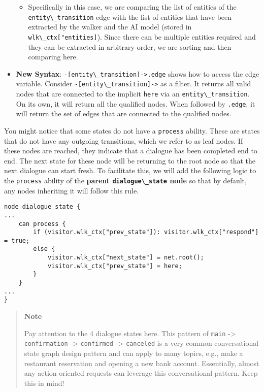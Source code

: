 \begin{itemize}
  \begin{itemize}
  \tightlist
  \item
    Specifically in this case, we are comparing the list of entities of
    the \passthrough{\lstinline!entity\_transition!} edge with the list
    of entities that have been extracted by the walker and the AI model
    (stored in \passthrough{\lstinline!wlk\_ctx["entities]!}). Since
    there can be multiple entities required and they can be extracted in
    arbitrary order, we are sorting and then comparing here.
  \end{itemize}
\item
  \textbf{New Syntax}:
  \passthrough{\lstinline!-[entity\_transition]->.edge!} shows how to
  access the edge variable. Consider
  \passthrough{\lstinline!-[entity\_transition]->!} as a filter. It
  returns all valid nodes that are connected to the implicit
  \passthrough{\lstinline!here!} via an
  \passthrough{\lstinline!entity\_transition!}. On its own, it will
  return all the qualified nodes. When followed by
  \passthrough{\lstinline!.edge!}, it will return the set of edges that
  are connected to the qualified nodes.
\end{itemize}

You might notice that some states do not have a
\passthrough{\lstinline!process!} ability. These are states that do not
have any outgoing transitions, which we refer to as leaf nodes. If these
nodes are reached, they indicate that a dialogue has been completed end
to end. The next state for these node will be returning to the root node
so that the next dialogue can start fresh. To facilitate this, we will
add the following logic to the \passthrough{\lstinline!process!} ability
of the \textbf{parent \passthrough{\lstinline!dialogue\_state!} node} so
that by default, any nodes inheriting it will follow this rule.

\begin{lstlisting}
node dialogue_state {
...
    can process {
        if (visitor.wlk_ctx["prev_state"]): visitor.wlk_ctx["respond"] = true;
        else {
            visitor.wlk_ctx["next_state"] = net.root();
            visitor.wlk_ctx["prev_state"] = here;
        }
    }
...
}
\end{lstlisting}

\begin{quote}
\textbf{Note}

Pay attention to the 4 dialogue states here. This pattern of
\passthrough{\lstinline!main!} -\textgreater{}
\passthrough{\lstinline!confirmation!} -\textgreater{}
\passthrough{\lstinline!confirmed!} -\textgreater{}
\passthrough{\lstinline!canceled!} is a very common conversational state
graph design pattern and can apply to many topics, e.g., make a
restaurant reservation and opening a new bank account. Essentially,
almost any action-oriented requests can leverage this conversational
pattern. Keep this in mind!
\end{quote}

